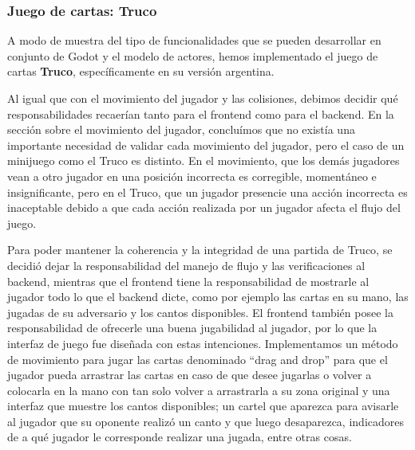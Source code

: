 
\subsubsection{Juego de cartas: Truco}
\noindent A modo de muestra del tipo de funcionalidades que se pueden desarrollar en conjunto de 
Godot y el modelo de actores, hemos implementado el juego de cartas \textbf{Truco}, específicamente 
en su versión argentina.

Al igual que con el movimiento del jugador y las colisiones, debimos decidir qué 
responsabilidades recaerían tanto para el frontend como para el backend. En la sección 
sobre el movimiento del jugador, concluímos que no existía una importante necesidad de 
validar cada movimiento del jugador, pero el caso de un minijuego como el Truco es distinto. 
En el movimiento, que los demás jugadores vean a otro jugador en una posición incorrecta es 
corregible, momentáneo e insignificante, pero en el Truco, que un jugador presencie una acción 
incorrecta es inaceptable debido a que cada acción realizada por un jugador afecta el flujo del juego.

Para poder mantener la coherencia y la integridad de una partida de Truco, se decidió dejar 
la responsabilidad del manejo de flujo y las verificaciones al backend, mientras que el 
frontend tiene la responsabilidad de mostrarle al jugador todo lo que el backend dicte, 
como por ejemplo las cartas en su mano, las jugadas de su adversario y los cantos disponibles. 
El frontend también posee la responsabilidad de ofrecerle una buena jugabilidad al jugador, 
por lo que la interfaz de juego fue diseñada con estas intenciones. Implementamos un método 
de movimiento para jugar las cartas denominado “drag and drop” para que el jugador pueda 
arrastrar las cartas en caso de que desee jugarlas o volver a colocarla en la mano con tan 
solo volver a arrastrarla a su zona original y una interfaz que muestre los cantos disponibles; 
un cartel que aparezca para avisarle al jugador que su oponente realizó un canto y que luego 
desaparezca, indicadores de a qué jugador le corresponde realizar una jugada, entre otras cosas.
